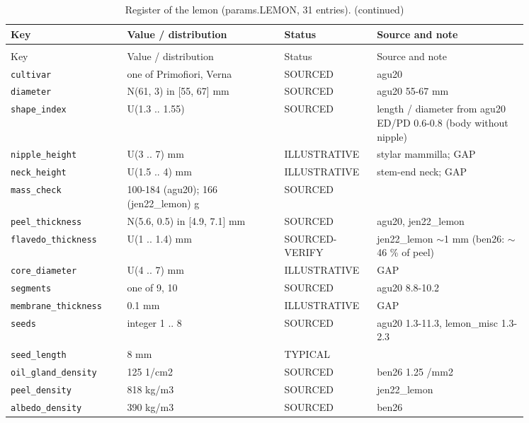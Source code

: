 \documentclass[10.5pt,a4paper]{article}
\begin{document}
{\scriptsize\begin{longtable}{@{}p{0.2\linewidth}p{0.27\linewidth}p{0.12\linewidth}p{0.26\linewidth}@{}}\caption{Register of the lemon (params.LEMON, 31 entries).}\\\toprule Key & Value / distribution & Status & Source and note \\\midrule\endfirsthead
\caption[]{Register of the lemon (params.LEMON, 31 entries). (continued)}\\\toprule Key & Value / distribution & Status & Source and note \\\midrule\endhead
\texttt{cultivar} & one of Primofiori, Verna & SOURCED & agu20 \\
\texttt{diameter} & N(61, 3) in [55, 67] mm & SOURCED & agu20 55-67 mm \\
\texttt{shape\_\allowbreak{}index} & U(1.3 .. 1.55) & SOURCED & length / diameter from agu20 ED/PD 0.6-0.8 (body without nipple) \\
\texttt{nipple\_\allowbreak{}height} & U(3 .. 7) mm & ILLUSTRATIVE & stylar mammilla; GAP \\
\texttt{neck\_\allowbreak{}height} & U(1.5 .. 4) mm & ILLUSTRATIVE & stem-end neck; GAP \\
\texttt{mass\_\allowbreak{}check} & 100-184 (agu20); 166 (jen22\_lemon) g & SOURCED &  \\
\texttt{peel\_\allowbreak{}thickness} & N(5.6, 0.5) in [4.9, 7.1] mm & SOURCED & agu20, jen22\_lemon \\
\texttt{flavedo\_\allowbreak{}thickness} & U(1 .. 1.4) mm & SOURCED-VERIFY & jen22\_lemon $\sim$1 mm (ben26: $\sim$46 \% of peel) \\
\texttt{core\_\allowbreak{}diameter} & U(4 .. 7) mm & ILLUSTRATIVE & GAP \\
\texttt{segments} & one of 9, 10 & SOURCED & agu20 8.8-10.2 \\
\texttt{membrane\_\allowbreak{}thickness} & 0.1 mm & ILLUSTRATIVE & GAP \\
\texttt{seeds} & integer 1 .. 8 & SOURCED & agu20 1.3-11.3, lemon\_misc 1.3-2.3 \\
\texttt{seed\_\allowbreak{}length} & 8 mm & TYPICAL &  \\
\texttt{oil\_\allowbreak{}gland\_\allowbreak{}density} & 125 1/cm2 & SOURCED & ben26 1.25 /mm2 \\
\texttt{peel\_\allowbreak{}density} & 818 kg/m3 & SOURCED & jen22\_lemon \\
\texttt{albedo\_\allowbreak{}density} & 390 kg/m3 & SOURCED & ben26 \\

\end{longtable}}
\end{document}
